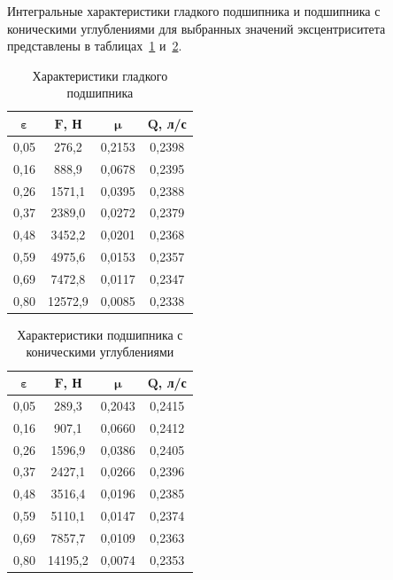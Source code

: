 Интегральные характеристики гладкого подшипника и подшипника с коническими углублениями для выбранных значений эксцентриситета представлены в таблицах~\ref{tab:smooth_results} и~\ref{tab:textured_results}.

\begin{table}[H]
\small
\centering
\caption{Характеристики гладкого подшипника}
\label{tab:smooth_results}
\begin{tabular}{|c|c|c|c|}
\hline
$\boldsymbol{\varepsilon}$ & $\boldsymbol{F}$\textbf{, Н} & $\boldsymbol{\mu}$ & $\boldsymbol{Q}$\textbf{, л/с} \\
\hline
0{,}05 & 276{,}2 & 0{,}2153 & 0{,}2398 \\
\hline
0{,}16 & 888{,}9 & 0{,}0678 & 0{,}2395 \\
\hline
0{,}26 & 1571{,}1 & 0{,}0395 & 0{,}2388 \\
\hline
0{,}37 & 2389{,}0 & 0{,}0272 & 0{,}2379 \\
\hline
0{,}48 & 3452{,}2 & 0{,}0201 & 0{,}2368 \\
\hline
0{,}59 & 4975{,}6 & 0{,}0153 & 0{,}2357 \\
\hline
0{,}69 & 7472{,}8 & 0{,}0117 & 0{,}2347 \\
\hline
0{,}80 & 12572{,}9 & 0{,}0085 & 0{,}2338 \\
\hline
\end{tabular}
\end{table}

\begin{table}[H]
\small
\centering
\caption{Характеристики подшипника с коническими углублениями}
\label{tab:textured_results}
\begin{tabular}{|c|c|c|c|}
\hline
$\boldsymbol{\varepsilon}$ & $\boldsymbol{F}$\textbf{, Н} & $\boldsymbol{\mu}$ & $\boldsymbol{Q}$\textbf{, л/с} \\
\hline
0{,}05 & 289{,}3 & 0{,}2043 & 0{,}2415 \\
\hline
0{,}16 & 907{,}1 & 0{,}0660 & 0{,}2412 \\
\hline
0{,}26 & 1596{,}9 & 0{,}0386 & 0{,}2405 \\
\hline
0{,}37 & 2427{,}1 & 0{,}0266 & 0{,}2396 \\
\hline
0{,}48 & 3516{,}4 & 0{,}0196 & 0{,}2385 \\
\hline
0{,}59 & 5110{,}1 & 0{,}0147 & 0{,}2374 \\
\hline
0{,}69 & 7857{,}7 & 0{,}0109 & 0{,}2363 \\
\hline
0{,}80 & 14195{,}2 & 0{,}0074 & 0{,}2353 \\
\hline
\end{tabular}
\end{table}

